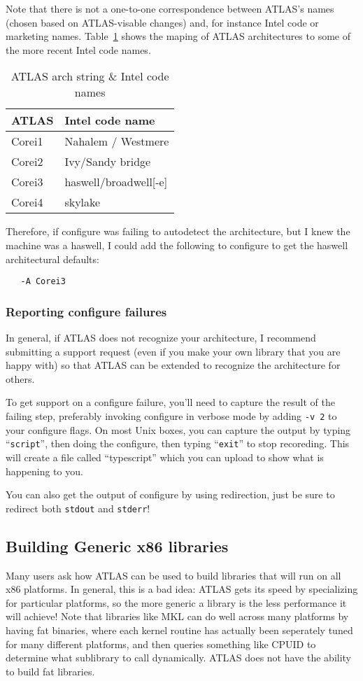 \documentclass[11pt]{article}
\begin{document}
Note that there is not a one-to-one correspondence between ATLAS's names
(chosen based on ATLAS-visable changes) and, for instance Intel code 
or marketing names.  Table~\ref{arch-intel} shows the maping of ATLAS
architectures to some of the more recent Intel code names.
\begin{table}
\begin{center}
\begin{tabular}{|l|l|}\hline\hline
{\bf ATLAS} & {\bf Intel code name}\\\hline\hline
Corei1 & Nahalem / Westmere \\\hline
Corei2 & Ivy/Sandy bridge \\\hline
Corei3 & haswell/broadwell[-e] \\\hline
Corei4 & skylake \\\hline\hline
\end{tabular}
\end{center}
\caption{ATLAS arch string \& Intel code names}
\label{arch-intel}
\end{table}

Therefore, if configure was failing to autodetect the architecture, but
I knew the machine was a haswell, I could add the following to configure
to get the haswell architectural defaults:
\begin{verbatim}
   -A Corei3
\end{verbatim}
\subsubsection{Reporting configure failures}
In general, if ATLAS does not recognize your architecture, I recommend
submitting a support request (even if you make your own library that you
are happy with) so that ATLAS can be extended to recognize the architecture
for others.  

To get support on a configure failure, you'll need to capture the result
of the failing step, preferably invoking configure in verbose mode by
adding \texttt{-v 2} to your configure flags.
On most Unix boxes, you can capture the output by typing ``\texttt{script}'',
then doing the configure, then typing ``\texttt{exit}'' to stop recoreding.
This will create a file called ``typescript'' which you can upload to
show what is happening to you.

You can also get the output of configure by using redirection, just be sure
to redirect both \texttt{stdout} and \texttt{stderr}!

\subsection{Building Generic x86 libraries}
Many users ask how ATLAS can be used to build libraries that will run on
all x86 platforms.  In general, this is a bad idea: ATLAS gets its speed by
specializing for particular platforms, so the more generic a library is the
less performance it will achieve!  Note that libraries like MKL can do well
across many platforms by having fat binaries, where each kernel routine has
actually
been seperately tuned for many different platforms, and then queries something
like CPUID
to determine what sublibrary to call dynamically.  ATLAS does not have the
ability to build fat libraries.
\end{document}
